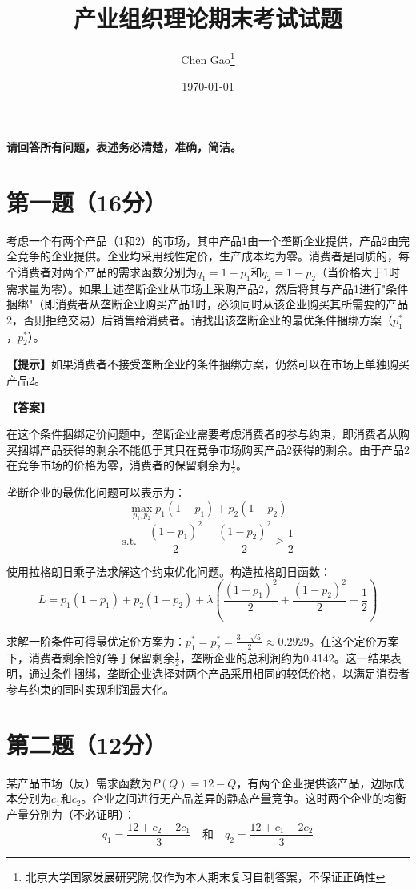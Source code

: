\documentclass[12pt]{article}
\begin{document}
\title{产业组织理论期末考试试题}
\author{Chen Gao\thanks{北京大学国家发展研究院,仅作为本人期末复习自制答案，不保证正确性}}
\date{\today}
\maketitle

\medskip
\noindent\textbf{请回答所有问题，表述务必清楚，准确，简洁。}

\section*{第一题（16分）}
考虑一个有两个产品（1和2）的市场，其中产品1由一个垄断企业提供，产品2由完全竞争的企业提供。企业均采用线性定价，生产成本均为零。消费者是同质的，每个消费者对两个产品的需求函数分别为$q_1 = 1- p_1$和$q_2 = 1- p_2$（当价格大于1时需求量为零）。如果上述垄断企业从市场上采购产品2，然后将其与产品1进行"条件捆绑"（即消费者从垄断企业购买产品1时，必须同时从该企业购买其所需要的产品2，否则拒绝交易）后销售给消费者。请找出该垄断企业的最优条件捆绑方案（$p_1^*$，$p_2^*$）。

\noindent\textbf{【提示】}如果消费者不接受垄断企业的条件捆绑方案，仍然可以在市场上单独购买产品2。

\noindent\textbf{【答案】}

在这个条件捆绑定价问题中，垄断企业需要考虑消费者的参与约束，即消费者从购买捆绑产品获得的剩余不能低于其只在竞争市场购买产品2获得的剩余。由于产品2在竞争市场的价格为零，消费者的保留剩余为$\frac{1}{2}$。

垄断企业的最优化问题可以表示为：
\[\max_{p_1,p_2} p_1(1-p_1) + p_2(1-p_2)\]
\[\text{s.t.} \quad \frac{(1-p_1)^2}{2} + \frac{(1-p_2)^2}{2} \geq \frac{1}{2}\]

使用拉格朗日乘子法求解这个约束优化问题。构造拉格朗日函数：
\[L = p_1(1-p_1) + p_2(1-p_2) + \lambda(\frac{(1-p_1)^2}{2} + \frac{(1-p_2)^2}{2} - \frac{1}{2})\]

求解一阶条件可得最优定价方案为：$p_1^* = p_2^* = \frac{3-\sqrt{5}}{2} \approx 0.2929$。在这个定价方案下，消费者剩余恰好等于保留剩余$\frac{1}{2}$，垄断企业的总利润约为0.4142。这一结果表明，通过条件捆绑，垄断企业选择对两个产品采用相同的较低价格，以满足消费者参与约束的同时实现利润最大化。

\section*{第二题（12分）}
某产品市场（反）需求函数为$P(Q)=12-Q$，有两个企业提供该产品，边际成本分别为$c_1$和$c_2$。企业之间进行无产品差异的静态产量竞争。这时两个企业的均衡产量分别为（不必证明）：
\[q_1=\frac{12+c_2-2c_1}{3}\quad\text{和}\quad q_2=\frac{12+c_1-2c_2}{3}\]
\end{document}
